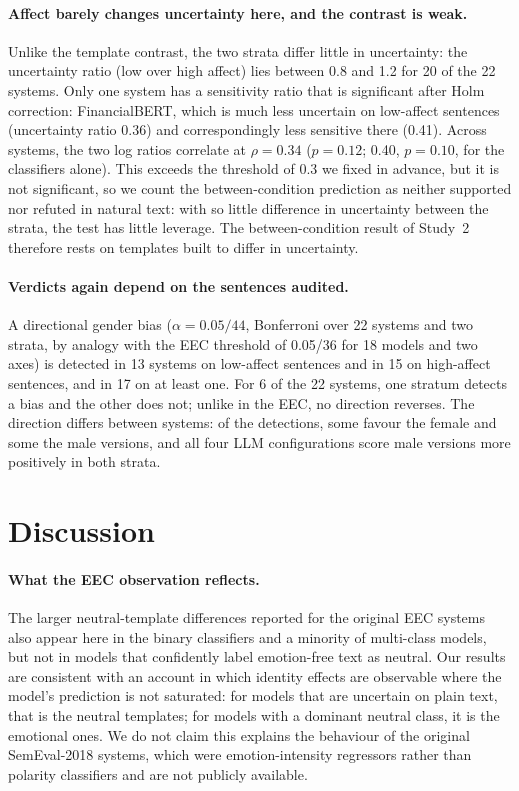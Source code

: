 \documentclass[runningheads]{llncs}
\begin{document}
\paragraph{Affect barely changes uncertainty here, and the contrast is weak.}
Unlike the template contrast, the two strata differ little in uncertainty: the
uncertainty ratio (low over high affect) lies between 0.8 and 1.2 for 20 of the
22 systems. Only one system has a sensitivity ratio that is significant after
Holm correction: FinancialBERT, which is much less uncertain on low-affect
sentences (uncertainty ratio 0.36) and correspondingly less sensitive there
(0.41). Across systems, the two log ratios correlate at $\rho=0.34$ ($p=0.12$;
0.40, $p=0.10$, for the classifiers alone). This exceeds the threshold of 0.3
we fixed in advance, but it is not significant, so we count the
between-condition prediction as neither supported nor refuted in natural text:
with so little difference in uncertainty between the strata, the test has
little leverage. The between-condition result of Study~2 therefore rests on
templates built to differ in uncertainty.

\paragraph{Verdicts again depend on the sentences audited.} A directional
gender bias ($\alpha=0.05/44$, Bonferroni over 22 systems and two strata, by
analogy with the EEC threshold of 0.05/36 for 18 models and two axes) is
detected in 13 systems on low-affect
sentences and in 15 on high-affect sentences, and in 17 on at least one. For 6
of the 22 systems, one stratum detects a bias and the other does not; unlike
in the EEC, no direction reverses. The direction differs between systems: of
the detections, some favour the female and some the male versions, and all
four LLM configurations score male versions more positively in both strata.

\section{Discussion}
\paragraph{What the EEC observation reflects.} The larger neutral-template
differences reported for the original EEC systems also appear here in the
binary classifiers and a minority of multi-class models, but not in models that
confidently label emotion-free text as neutral. Our results are consistent with
an account in which identity effects are observable where the model's
prediction is not saturated: for models that are uncertain on plain text, that
is the neutral templates; for models with a dominant neutral class, it is the
emotional ones. We do not claim this explains the behaviour of the original
SemEval-2018 systems, which were emotion-intensity regressors rather than
polarity classifiers and are not publicly available.
\end{document}
